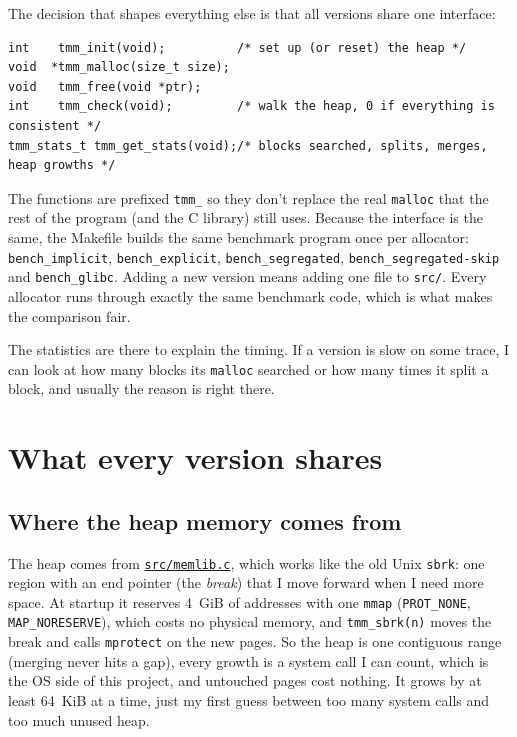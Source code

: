 \documentclass[11pt,letterpaper]{article}
\newcommand{\repo}{https://github.com/yazeed1s/tmalloc}
\newcommand{\src}[1]{\href{\repo/blob/main/#1}{\texttt{#1}}}
\begin{document}
The decision that shapes everything else is that all versions share one interface:

\begin{lstlisting}
int    tmm_init(void);          /* set up (or reset) the heap */
void  *tmm_malloc(size_t size);
void   tmm_free(void *ptr);
int    tmm_check(void);         /* walk the heap, 0 if everything is consistent */
tmm_stats_t tmm_get_stats(void);/* blocks searched, splits, merges, heap growths */
\end{lstlisting}

The functions are prefixed \texttt{tmm\_} so they don't replace the real \texttt{malloc} that the rest of the program (and the C library) still uses. Because the interface is the same, the Makefile builds the same benchmark program once per allocator: \texttt{bench\_implicit}, \texttt{bench\_explicit}, \texttt{bench\_segregated}, \texttt{bench\_segregated-skip} and \texttt{bench\_glibc}. Adding a new version means adding one file to \texttt{src/}. Every allocator runs through exactly the same benchmark code, which is what makes the comparison fair.

The statistics are there to explain the timing. If a version is slow on some trace, I can look at how many blocks its \texttt{malloc} searched or how many times it split a block, and usually the reason is right there.

\section{What every version shares}
\label{sec:shared}

\subsection*{Where the heap memory comes from}

The heap comes from \src{src/memlib.c}, which works like the old Unix \texttt{sbrk}: one region with an end pointer (the \emph{break}) that I move forward when I need more space. At startup it reserves 4~GiB of addresses with one \texttt{mmap} (\texttt{PROT\_NONE}, \texttt{MAP\_NORESERVE}), which costs no physical memory, and \texttt{tmm\_sbrk(n)} moves the break and calls \texttt{mprotect} on the new pages. So the heap is one contiguous range (merging never hits a gap), every growth is a system call I can count, which is the OS side of this project, and untouched pages cost nothing. It grows by at least 64~KiB at a time, just my first guess between too many system calls and too much unused heap.
\end{document}
